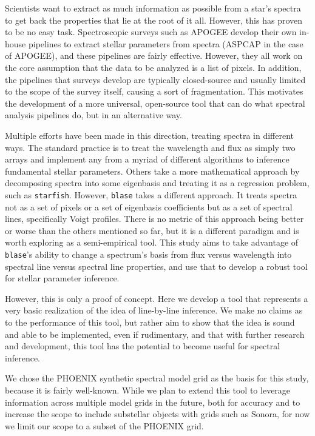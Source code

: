 \documentclass[twocolumn]{aastex631}
\begin{document}
Scientists want to extract as much information as possible from
a star's spectra to get back the properties that lie at the root of it all. 
However, this has proven to be no easy task. Spectroscopic surveys such as 
APOGEE develop their own in-house pipelines to extract stellar parameters
from spectra (ASPCAP in the case of APOGEE), and these pipelines are fairly
effective. However, they all work on the core assumption that the data to be 
analyzed is a list of pixels. In addition, the pipelines that surveys 
develop are typically closed-source and usually limited to the scope of the 
survey itself, causing a sort of fragmentation. This motivates the 
development of a more universal, open-source tool that can do what spectral 
analysis pipelines do, but in an alternative way. 

Multiple efforts have been made in this direction, treating spectra in 
different ways. The standard practice is to treat the wavelength and flux as 
simply two arrays and implement any from a myriad of different algorithms to 
inference fundamental stellar parameters. Others take a more mathematical 
approach by decomposing spectra into some eigenbasis and treating it as a 
regression problem, such as \texttt{starfish}. However, \texttt{blase} takes 
a different approach. It treats spectra not as a set of pixels or a set of 
eigenbasis coefficients but as a set of spectral lines, specifically Voigt 
profiles. There is no metric of this approach being better or worse than the 
others mentioned so far, but it is a different paradigm and is worth 
exploring as a semi-empirical tool. This study aims to take advantage of 
\texttt{blase}'s ability to change a spectrum's basis from flux versus 
wavelength into spectral line versus spectral line properties, and use that 
to develop a robust tool for stellar parameter inference.

However, this is only a proof of concept. Here we develop a tool that 
represents a very basic realization of the idea of line-by-line inference. 
We make no claims as to the performance of this tool, but rather aim to show 
that the idea is sound and able to be implemented, even if rudimentary, and 
that with further research and development, this tool has the potential to 
become useful for spectral inference.

We chose the PHOENIX synthetic spectral model grid as the basis for this 
study, because it is fairly well-known. While we plan to extend this tool to 
leverage information across multiple model grids in the future, both for 
accuracy and to increase the scope to include substellar objects with grids
such as Sonora, for now we limit our scope to a subset of the PHOENIX grid.
\end{document}
